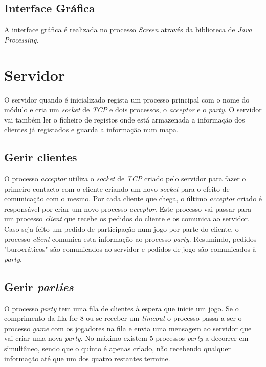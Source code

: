 \documentclass[11pt,a4paper]{report}
\begin{document}
\section{Interface Gráfica}
A interface gráfica é realizada no processo \textit{Screen} através da biblioteca de \textit{Java} \textit{Processing}.



\chapter{Servidor}

O servidor quando é inicializado regista um processo principal com o nome do módulo e cria um \textit{socket} de \textit{TCP} e dois processos, o \textit{acceptor} e o \textit{party}.  O servidor vai também ler o ficheiro de registos onde está armazenada a informação dos clientes já registados e guarda a informação num mapa.

\section{Gerir clientes}
O processo \textit{acceptor} utiliza o \textit{socket} de \textit{TCP} criado pelo servidor para fazer o primeiro contacto com o cliente criando um novo \textit{socket} para o efeito de comunicação com o mesmo. Por cada cliente que chega, o último \textit{acceptor} criado é responsável por criar um novo processo \textit{acceptor}. Este processo vai passar para um processo \textit{client} que recebe os pedidos do cliente e os comunica ao servidor. Caso seja feito um pedido de participação num jogo por parte do cliente, o processo \textit{client} comunica esta informação ao processo \textit{party}. Resumindo, pedidos "burocráticos" são comunicados ao servidor e pedidos de jogo são comunicados à \textit{party}.

\section{Gerir \textit{parties}}
O processo \textit{party} tem uma fila de clientes à espera que inicie um jogo. Se o comprimento da fila for 8 ou se receber um \textit{timeout} o processo passa a ser o processo \textit{game} com os jogadores na fila e envia uma mensagem ao servidor que vai criar uma nova \textit{party}. No máximo existem 5 processos \textit{party} a decorrer em simultâneo, sendo que o quinto é apenas criado, não recebendo qualquer informação até que um dos quatro restantes termine.
\end{document}
